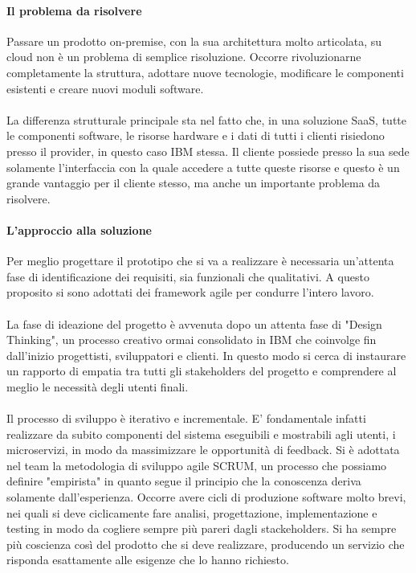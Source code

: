 \paragraph{Il problema da risolvere}
Passare un prodotto on-premise, con la sua architettura molto articolata, su cloud non è un problema di semplice risoluzione. Occorre rivoluzionarne completamente la struttura, adottare nuove tecnologie, modificare le componenti esistenti e creare nuovi moduli software. 

\paragraph{}
La differenza strutturale principale sta nel fatto che, in una soluzione SaaS, tutte le componenti software, le risorse hardware e i dati di tutti i clienti risiedono presso il provider, in questo caso IBM stessa. Il cliente possiede presso la sua sede solamente l'interfaccia con la quale accedere a tutte queste risorse e questo è un grande vantaggio per il cliente stesso, ma anche un importante problema da risolvere. 

\paragraph{L'approccio alla soluzione}
Per meglio progettare il prototipo che si va a realizzare è necessaria un'attenta fase di identificazione dei requisiti, sia funzionali che qualitativi. A questo proposito si sono adottati dei framework agile per condurre l'intero lavoro. 
\paragraph{}
La fase di ideazione del progetto è avvenuta dopo un attenta fase di "Design Thinking", un processo creativo ormai consolidato in IBM che coinvolge fin dall'inizio progettisti, sviluppatori e clienti. In questo modo si cerca di instaurare un rapporto di empatia tra tutti gli stakeholders del progetto e comprendere al meglio le necessità degli utenti finali.
\paragraph{}
Il processo di sviluppo è iterativo e incrementale. E' fondamentale infatti realizzare da subito componenti del sistema eseguibili e mostrabili agli utenti, i microservizi, in modo da massimizzare le opportunità di feedback. Si è adottata nel team la metodologia di sviluppo agile SCRUM, un processo che possiamo definire "empirista" in quanto segue il principio che la conoscenza deriva solamente dall'esperienza. Occorre avere cicli di produzione software molto brevi, nei quali si deve ciclicamente fare analisi, progettazione, implementazione e testing in modo da cogliere sempre più pareri dagli stackeholders. Si ha sempre più coscienza così del prodotto che si deve realizzare, producendo un servizio che risponda esattamente alle esigenze che lo hanno richiesto.

